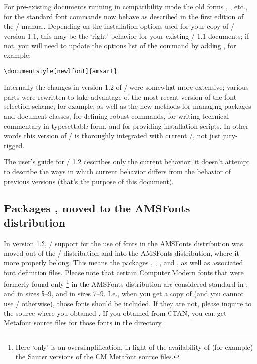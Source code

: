 \documentclass{amsdtx}
\begin{document}
For pre-existing documents running in compatibility mode the old forms
, , etc., for the standard font commands now behave as
described in the first edition of the \latex/ manual. Depending on the
installation options used for your copy of \amslatex/ version 1.1, this
may be the `right' behavior for your existing \amslatex/ 1.1 documents;
if not, you will need to update the options list of the
 command by adding , for example:
\begin{verbatim}
\documentstyle[newlfont]{amsart}
\end{verbatim}

Internally the changes in version 1.2 of \amslatex/ were somewhat more
extensive; various parts were rewritten to take advantage of the most
recent version of the font selection scheme, for example, as well as the
new methods for managing packages and document classes, for defining
robust commands, for writing technical commentary in typesettable form,
and for providing installation scripts. In other words this version of
\amslatex/ is thoroughly integrated with current \latex/, not just
jury-rigged.

The user's guide for \amslatex/ 1.2 describes only the current behavior;
it doesn't attempt to describe the ways in which current behavior
differs from the behavior of previous versions (that's the purpose of
this document).

\subsection{Packages ,  moved to the AMSFonts
distribution}

In version 1.2, \latex/ support for the use of fonts in the AMSFonts
distribution was moved out of the \amslatex/ distribution and into the
AMSFonts distribution, where it more properly belong. This means the
packages , , , and
, as well as associated font definition files. Please note
that certain Computer Modern fonts that were formerly found only%
\footnote{Here `only' is an oversimplification, in light of the
availability of (for example) the Sauter versions of the CM Metafont
source files.}
in the AMSFonts distribution are considered standard in \LaTeXe{}:
 and  in sizes 5--9, and  in sizes 7--9.
I.e., when you get a copy of \LaTeXe{} (and you cannot use \amslatex/
otherwise), those fonts should be included. If they are not, please
inquire to the source where you obtained \LaTeXe{}. If you obtained
\LaTeXe{} from CTAN, you can get Metafont source files for those fonts
in the directory .
\end{document}
